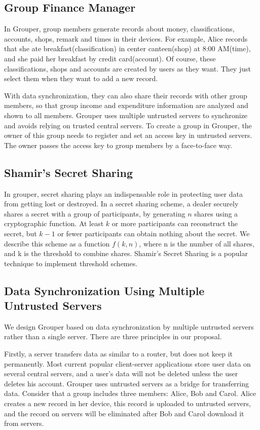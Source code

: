 \documentclass[twocolumn,10pt]{article}
\begin{document}
\subsection{Group Finance Manager}
 In Grouper, group members generate records about money, classifications, accounts, shops, remark and times in their devices. For example, Alice records that she ate breakfast(classification) in center canteen(shop) at 8:00 AM(time), and she paid her breakfast by credit card(account). Of course, these classifications, shops and accounts are created by users as they want. They just select them when they want to add a new record.
 
 With data synchronization, they can also share their records with other group members, so that group income and expenditure information are analyzed and shown to all members. Grouper uses multiple untrusted servers to synchronize and avoids relying on trusted central servers. To create a group in Grouper, the owner of this group needs to register and set an access key in untrusted servers. The owner passes the access key to group members by a face-to-face way.

\subsection{Shamir's Secret Sharing}
In grouper, secret sharing plays an indispensable role in protecting user data from getting lost or destroyed. In a secret sharing scheme, a dealer securely shares a secret with a group of participants, by generating $n$ shares using a cryptographic function\cite{smith2013layered}. At least $k$ or more participants can reconstruct the secret, but $k-1$ or fewer participants can obtain nothing about the secret\cite{pang2005new}. We describe this scheme as a function $f(k, n)$, where n is the number of all shares, and k is the threshold to combine shares.  Shamir's Secret Sharing is a popular technique to implement threshold schemes.

\subsection{Data Synchronization Using Multiple Untrusted Servers}

We design Grouper based on data synchronization by multiple untrusted servers rather than a single server. There are three principles in our proposal. 

Firstly, a server transfers data as similar to a router, but does not keep it permanently. Most current popular client-server applications store user data on several central servers, and a user's data will not be deleted unless the user deletes his account. Grouper uses untrusted servers as a bridge for transferring data. Consider that a group includes three members: Alice, Bob and Carol. Alice creates a new record in her device, this record is uploaded to untrusted servers, and the record on servers will be eliminated after Bob and Carol download it from servers.
\end{document}
